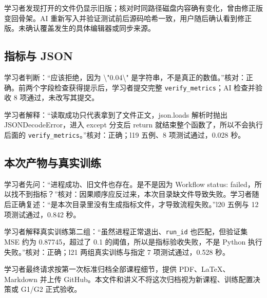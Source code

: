 \documentclass[UTF8,zihao=-4,fontset=fandol]{ctexart}
\begin{document}
学习者发现打开的文件仍显示旧版；核对时同路径磁盘内容确有变化，曾由修正版变回骨架。AI 重新写入并验证测试前后源码哈希一致，用户随后确认看到修正版。未确认覆盖发生的具体编辑器或同步来源。

\subsection{指标与 JSON}

学习者判断：“应该拒绝，因为 \textbackslash{}"0.04\textbackslash{}" 是字符串，不是真正的数值。”核对：正确。前两个字段检查获得提示后，学习者提交完整 \nolinkurl{verify_metrics}；AI 检查并验收 8 项通过，未改写其提交。

学习者解释：“读取成功只代表拿到了文件正文，json.loads 解析时抛出 JSONDecodeError，进入 except 分支后 return 就结束整个函数了，所以不会执行后面的 \nolinkurl{verify_metrics}。”核对：正确；l19 五例、8 项测试通过，0.028 秒。

\subsection{本次产物与真实训练}

学习者先问：“进程成功、旧文件也存在。是不是因为 Workflow status: failed，所以找不到指标？”核对：因果顺序应反过来，本次目录缺文件导致失败。学习者随后正确复述：“是本次目录里没有生成指标文件，才导致流程失败。”l20 五例与 12 项测试通过，0.842 秒。

学习者解释真实训练第二组：“虽然进程正常退出、\nolinkurl{run_id} 也匹配，但验证集 MSE 约为 0.87745，超过了 0.1 的阈值，所以是指标验收失败，不是 Python 执行失败。”核对：正确；l21 两组真实训练与指定 7 项测试通过，0.528 秒。

学习者最终请求按第一次标准归档全部课程细节，提供 PDF、LaTeX、Markdown 并上传 GitHub。本文件和讲义不将这次归档视为新课程、训练配置决策或 G1/G2 正式验收。
\end{document}
